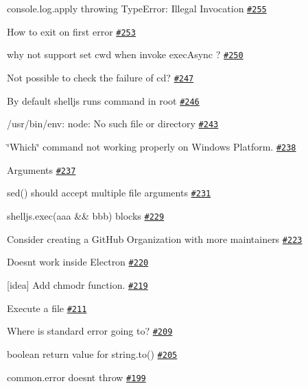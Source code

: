\begin{DoxyItemize}
\item console.\+log.\+apply throwing Type\+Error\+: Illegal Invocation \href{https://github.com/shelljs/shelljs/issues/255}{\tt \#255}
\item How to exit on first error \href{https://github.com/shelljs/shelljs/issues/253}{\tt \#253}
\item why not support set \textquotesingle{}cwd\textquotesingle{} when invoke exec\+Async ? \href{https://github.com/shelljs/shelljs/issues/250}{\tt \#250}
\item Not possible to check the failure of cd? \href{https://github.com/shelljs/shelljs/issues/247}{\tt \#247}
\item By default shelljs runs command in root \href{https://github.com/shelljs/shelljs/issues/246}{\tt \#246}
\item /usr/bin/env\+: node\+: No such file or directory \href{https://github.com/shelljs/shelljs/issues/243}{\tt \#243}
\item \char`\"{}\+Which\char`\"{} command not working properly on Windows Platform. \href{https://github.com/shelljs/shelljs/issues/238}{\tt \#238}
\item Arguments \href{https://github.com/shelljs/shelljs/issues/237}{\tt \#237}
\item sed() should accept multiple file arguments \href{https://github.com/shelljs/shelljs/issues/231}{\tt \#231}
\item shelljs.\+exec(\textquotesingle{}aaa \&\& bbb\textquotesingle{}) blocks \href{https://github.com/shelljs/shelljs/issues/229}{\tt \#229}
\item Consider creating a Git\+Hub Organization with more maintainers \href{https://github.com/shelljs/shelljs/issues/223}{\tt \#223}
\item Doesn\textquotesingle{}t work inside Electron \href{https://github.com/shelljs/shelljs/issues/220}{\tt \#220}
\item \mbox{[}idea\mbox{]} Add chmodr function. \href{https://github.com/shelljs/shelljs/issues/219}{\tt \#219}
\item Execute a file \href{https://github.com/shelljs/shelljs/issues/211}{\tt \#211}
\item Where is standard error going to? \href{https://github.com/shelljs/shelljs/issues/209}{\tt \#209}
\item boolean return value for string.\+to() \href{https://github.com/shelljs/shelljs/issues/205}{\tt \#205}
\item {\ttfamily common.\+error} doesn\textquotesingle{}t throw \href{https://github.com/shelljs/shelljs/issues/199}{\tt \#199}

\end{DoxyItemize}
